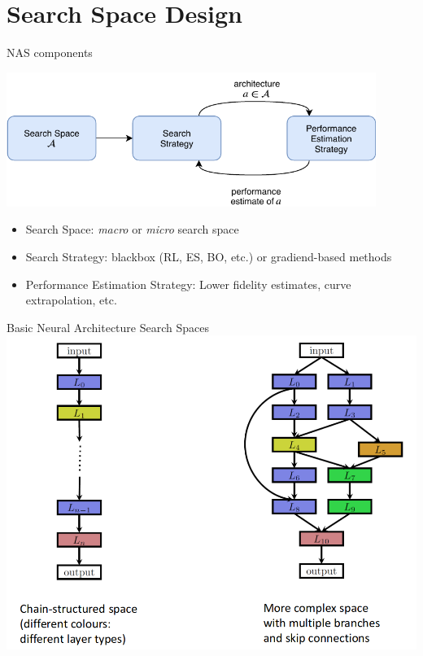 \section{Search Space Design}
\begin{frame}[c]{NAS components}

\centering
\includegraphics[width=0.9\textwidth]{images_lec7/NAS_diagram.pdf}

\begin{itemize}
	\item \alert{Search Space:} \textit{macro} or \textit{micro} search space
	\item \alert{Search Strategy:} blackbox (RL, ES, BO, etc.) or gradiend-based methods
	\item \alert{Performance Estimation Strategy:} Lower fidelity estimates, curve extrapolation, etc.
\end{itemize}

\end{frame}
\begin{frame}[c]{Basic Neural Architecture Search Spaces}
\centering
\includegraphics[height=0.9\textheight]{images_lec7/macro_space.png}
\end{frame}
